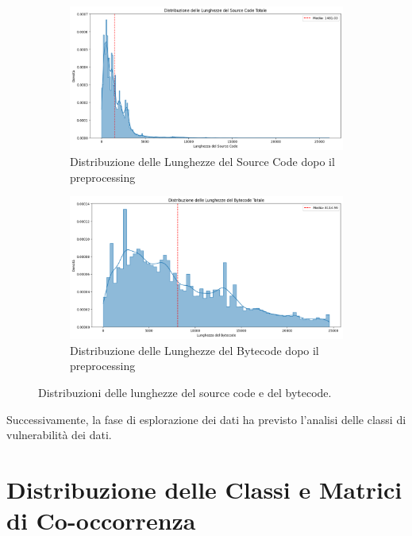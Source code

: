 \documentclass[../../Thesis.tex]{subfiles}
\begin{document}
\begin{figure}[htbp]
    \centering
    \begin{subfigure}[b]{0.49\textwidth}
        \centering
        \includegraphics[width=\textwidth]{../../img/SCTokensPreprocessed.png}
        \caption{Distribuzione delle Lunghezze del Source Code dopo il preprocessing}
        \label{fig:sourcecode_length_distribution}
    \end{subfigure}
    \hfill
    \begin{subfigure}[b]{0.49\textwidth}
        \centering
        \includegraphics[width=\textwidth]{../../img/BCTokensPreprocessed.png}
        \caption{Distribuzione delle Lunghezze del Bytecode dopo il preprocessing}
        \label{fig:bytecode_length_distribution}
    \end{subfigure}
    \caption{Distribuzioni delle lunghezze del source code e del bytecode.}
    \label{fig:length_distributions}
\end{figure}
Successivamente, la fase di esplorazione dei dati ha previsto l'analisi delle classi di vulnerabilità dei dati. 

\section{Distribuzione delle Classi e Matrici di Co-occorrenza}
\end{document}
